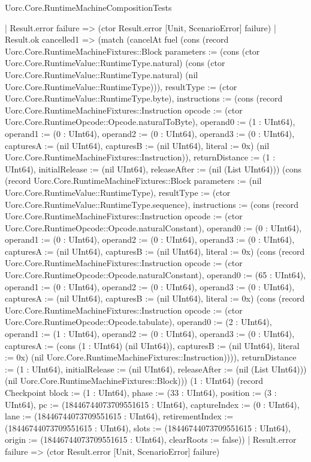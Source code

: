 \begin{lexlean}{Uorc.Core.RuntimeMachineCompositionTests}
\begin{semanticmodule}
{      | Result.error failure => (ctor Result.error [Unit, ScenarioError] failure)
      | Result.ok cancelled1 => (match (cancelAt fuel (cons (record Uorc.Core.RuntimeMachineFixtures::Block {parameters := (cons (ctor Uorc.Core.RuntimeValue::RuntimeType.natural) (cons (ctor Uorc.Core.RuntimeValue::RuntimeType.natural) (nil Uorc.Core.RuntimeValue::RuntimeType))), resultType := (ctor Uorc.Core.RuntimeValue::RuntimeType.byte), instructions := (cons (record Uorc.Core.RuntimeMachineFixtures::Instruction {opcode := (ctor Uorc.Core.RuntimeOpcode::Opcode.naturalToByte), operand0 := (1 : UInt64), operand1 := (0 : UInt64), operand2 := (0 : UInt64), operand3 := (0 : UInt64), capturesA := (nil UInt64), capturesB := (nil UInt64), literal := 0x}) (nil Uorc.Core.RuntimeMachineFixtures::Instruction)), returnDistance := (1 : UInt64), initialRelease := (nil UInt64), releaseAfter := (nil (List UInt64))}) (cons (record Uorc.Core.RuntimeMachineFixtures::Block {parameters := (nil Uorc.Core.RuntimeValue::RuntimeType), resultType := (ctor Uorc.Core.RuntimeValue::RuntimeType.sequence), instructions := (cons (record Uorc.Core.RuntimeMachineFixtures::Instruction {opcode := (ctor Uorc.Core.RuntimeOpcode::Opcode.naturalConstant), operand0 := (0 : UInt64), operand1 := (0 : UInt64), operand2 := (0 : UInt64), operand3 := (0 : UInt64), capturesA := (nil UInt64), capturesB := (nil UInt64), literal := 0x}) (cons (record Uorc.Core.RuntimeMachineFixtures::Instruction {opcode := (ctor Uorc.Core.RuntimeOpcode::Opcode.naturalConstant), operand0 := (65 : UInt64), operand1 := (0 : UInt64), operand2 := (0 : UInt64), operand3 := (0 : UInt64), capturesA := (nil UInt64), capturesB := (nil UInt64), literal := 0x}) (cons (record Uorc.Core.RuntimeMachineFixtures::Instruction {opcode := (ctor Uorc.Core.RuntimeOpcode::Opcode.tabulate), operand0 := (2 : UInt64), operand1 := (1 : UInt64), operand2 := (0 : UInt64), operand3 := (0 : UInt64), capturesA := (cons (1 : UInt64) (nil UInt64)), capturesB := (nil UInt64), literal := 0x}) (nil Uorc.Core.RuntimeMachineFixtures::Instruction)))), returnDistance := (1 : UInt64), initialRelease := (nil UInt64), releaseAfter := (nil (List UInt64))}) (nil Uorc.Core.RuntimeMachineFixtures::Block))) (1 : UInt64) (record Checkpoint {block := (1 : UInt64), phase := (33 : UInt64), position := (3 : UInt64), pc := (18446744073709551615 : UInt64), captureIndex := (0 : UInt64), lane := (18446744073709551615 : UInt64), retirementIndex := (18446744073709551615 : UInt64), slots := (18446744073709551615 : UInt64), origin := (18446744073709551615 : UInt64), clearRoots := false}))
        | Result.error failure => (ctor Result.error [Unit, ScenarioError] failure)
}
\end{semanticmodule}
\end{lexlean}

